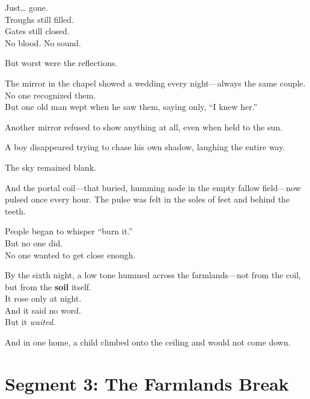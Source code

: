 \documentclass[9pt]{article}
\begin{document}
\vspace{0.5em}
Just\ldots{} gone.\\
Troughs still filled.\\
Gates still closed.\\
No blood. No sound.

\vspace{0.5em}
But worst were the reflections.

\vspace{0.5em}
The mirror in the chapel showed a wedding every night---always the same couple.\\
No one recognized them.\\
But one old man wept when he saw them, saying only, ``I knew her.''

\vspace{0.5em}
Another mirror refused to show anything at all, even when held to the sun.

\vspace{0.5em}
A boy disappeared trying to chase his own shadow, laughing the entire way.

\vspace{0.5em}
The sky remained blank.

\vspace{0.5em}
And the portal coil---that buried, humming node in the empty fallow field---now pulsed once every hour. The pulse was felt in the soles of feet and behind the teeth.

\vspace{0.5em}
People began to whisper ``burn it.''\\
But no one did.\\
No one wanted to get close enough.

\vspace{0.5em}
By the sixth night, a low tone hummed across the farmlands---not from the coil, but from the \textbf{soil} itself.\\
It rose only at night.\\
And it said no word.\\
But it \textit{waited}.

\vspace{0.5em}
And in one home, a child climbed onto the ceiling and would not come down.

\newpage

\section*{Segment 3: The Farmlands Break}
\end{document}
